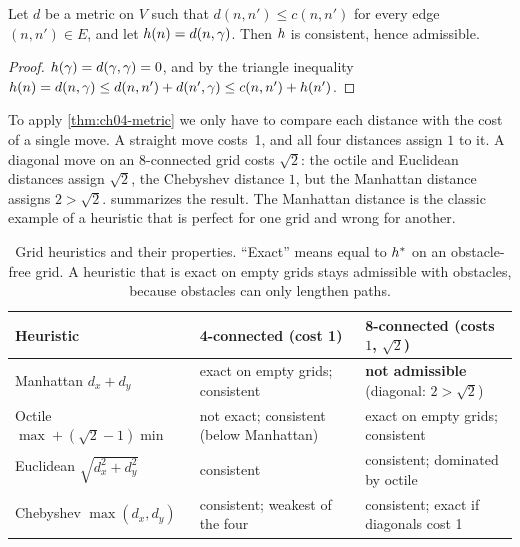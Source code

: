 \begin{proposition}
\label{thm:ch04-metric}
Let $d$ be a metric on $V$ such that $d(n, n') \le c(n, n')$ for every edge
$(n, n') \in E$, and let $h(n) = d(n, \gamma)$. Then $h$ is
consistent, hence admissible.
\end{proposition}
\begin{proof}
$h(\gamma) = d(\gamma, \gamma) = 0$, and by the triangle inequality
$h(n) = d(n, \gamma) \le d(n, n') + d(n', \gamma) \le c(n, n') + h(n')$.
\end{proof}

To apply \cref{thm:ch04-metric} we only have to compare each distance with the
cost of a single move. A straight move costs~1, and all four distances assign
$1$ to it. A diagonal move on an 8-connected grid costs $\sqrt{2}$: the octile
and Euclidean distances assign $\sqrt{2}$, the Chebyshev distance $1$, but the
Manhattan distance assigns $2 > \sqrt{2}$.  summarizes
the result. The Manhattan distance is the classic example of a heuristic that is
perfect for one grid and wrong for another.

\begin{table}[tb]
  \centering\footnotesize
  \caption{Grid heuristics and their properties. ``Exact'' means equal to
  $h^*$ on an obstacle-free grid. A heuristic that is exact on empty grids
  stays admissible with obstacles, because obstacles can only lengthen paths.}
  \label{tab:ch04-heuristics}
  \begin{tabular}{@{}lll@{}}
  \toprule
  Heuristic & 4-connected (cost 1) & 8-connected (costs $1$, $\sqrt{2}$)\\
  \midrule
  Manhattan $d_x + d_y$ & exact on empty grids; consistent & \textbf{not admissible} (diagonal: $2 > \sqrt{2}$)\\
  Octile $\max + (\sqrt{2}-1)\min$ & not exact; consistent (below Manhattan) & exact on empty grids; consistent\\
  Euclidean $\sqrt{d_x^2 + d_y^2}$ & consistent & consistent; dominated by octile\\
  Chebyshev $\max(d_x, d_y)$ & consistent; weakest of the four & consistent; exact if diagonals cost 1\\
  \bottomrule
  \end{tabular}
\end{table}

